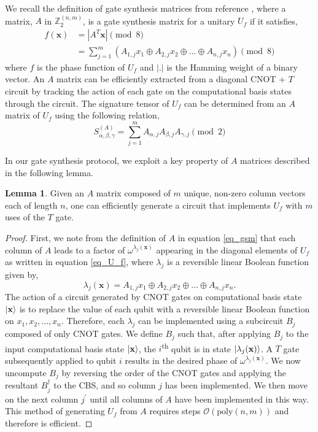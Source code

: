 \documentclass[notitlepage]{article}
\theoremstyle{definition}
\theoremstyle{problem}
\theoremstyle{lemma}
\newtheorem{lemma}{Lemma}[section]
\begin{document}
We recall the definition of gate synthesis matrices from reference \cite{4_Campbell_2017}, where a matrix, $A$ in $\mathbb{Z}_2^{(n,m)}$, is a gate synthesis matrix for a unitary $U_f$ if it satisfies,
\begin{align}
\label{eq_gsm}
f(\mathbf{x}) &= |A^T\mathbf{x}| \pmod{8} \\&= \sum_{j=1}^{m}(A_{1,j}x_1 \oplus A_{2,j}x_2 \oplus \dots \oplus A_{n,j}x_n) \pmod{8}
\end{align}
where $f$ is the phase function of $U_f$ and $|.|$ is the Hamming weight of a binary vector. An $A$ matrix can be efficiently extracted from a diagonal CNOT + $T$ circuit by tracking the action of each gate on the computational basis states through the circuit. 
The signature tensor of $U_f$ can be determined from an $A$ matrix of $U_f$ using the following relation,
\begin{equation}
	\label{eq_sig}
	S^{(A)}_{\alpha,\beta,\gamma} = \sum_{j=1}^m A_{\alpha,j}A_{\beta,j}A_{\gamma,j} \pmod{2}
\end{equation}

In our gate synthesis protocol, we exploit a key property of $A$ matrices described in the following lemma.
\begin{lemma}
	\label{l_gsm2circ}
	Given an $A$ matrix composed of $m$ unique, non-zero column vectors each of length $n$, one can efficiently generate a circuit that implements $U_f$ with $m$ uses of the $T$ gate.
\end{lemma}
\begin{proof}
	First, we note from the definition of $A$ in equation \ref{eq_gsm} that each column of $A$ leads to a factor of $\omega^{\lambda_j(\mathbf{x})}$ appearing in the diagonal elements of $U_f$ as written in equation \ref{eq_U_f}, where $\lambda_j$ is a reversible linear Boolean function given by,
	\begin{equation}
	\lambda_j(\mathbf{x}) = A_{1,j}x_1 \oplus A_{2,j}x_2 \oplus \dots \oplus A_{n,j}x_n.
	\end{equation}
	The action of a circuit generated by CNOT gates on computational basis state $\left\vert{\mathbf{x}}\right\rangle$ is to replace the value of each qubit with a reversible linear Boolean function on $x_1, x_2, \dots, x_n$. Therefore, each $\lambda_j$ can be implemented using a subcircuit $B_j$ composed of only CNOT gates. We define $B_j$ such that, after applying $B_j$ to the input computational basis state $\left\vert{\mathbf{x}}\right\rangle$, the $i$\textsuperscript{th} qubit is in state $\left\vert{\lambda_j(\mathbf{x})}\right\rangle$. A $T$ gate subsequently applied to qubit $i$ results in the desired phase of $\omega^{\lambda_j(\mathbf{x})}$. We now uncompute $B_j$ by reversing the order of the CNOT gates and applying the resultant $B_j^\dagger$ to the CBS, and so column $j$ has been implemented. We then move on the next column $j^\prime$ until all columns of $A$ have been implemented in this way. This method of generating $U_f$ from $A$ requires steps $\mathcal{O}(\textrm{poly}(n,m))$ and therefore is efficient.
\end{proof}
\end{document}
